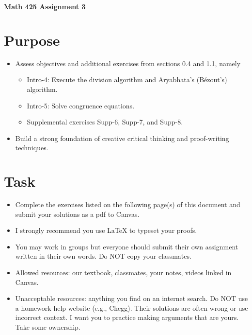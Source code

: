 \documentclass[12pt]{article}
\begin{document}
	\begin{center}
		{\Large \bf Math 425 Assignment 3}
	\end{center}
	\section*{Purpose}
		\begin{itemize}
			\item Assess objectives and additional exercises from sections 0.4 and 1.1, namely
				\begin{itemize}
					\item Intro-4: Execute the division algorithm and Aryabhata’s (Bézout’s) algorithm.
					\item Intro-5: Solve congruence equations.
					\item Supplemental exercises Supp-6, Supp-7, and Supp-8. 
				\end{itemize}
			\item Build a strong foundation of creative critical thinking and proof-writing techniques.
		\end{itemize}
	\section*{Task}
		\begin{itemize}
			\item Complete the exercises listed on the following page(s) of this document and submit your solutions as a pdf to Canvas.
			\item I strongly recommend you use LaTeX to typeset your proofs.
			\item You may work in groups but everyone should submit their own assignment written in their own words.  Do NOT copy your classmates.
			\item Allowed resources: our textbook, classmates, your notes, videos linked in Canvas.
			\item Unacceptable resources: anything you find on an internet search. Do NOT use a homework help website (e.g., Chegg). Their solutions are often wrong or use incorrect context.  I want you to practice making arguments that are yours. Take some ownership.
		\end{itemize}
\end{document}

